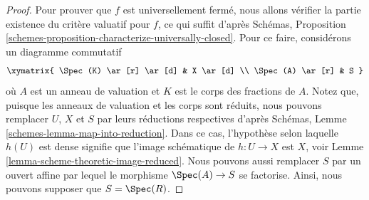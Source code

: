 \begin{proof}
Pour prouver que $f$ est universellement fermé, nous allons vérifier
la partie existence du critère valuatif pour
$f$, ce qui suffit d'après Schémas, Proposition \ref{schemes-proposition-characterize-universally-closed}. Pour ce faire,
considérons un diagramme commutatif
$$
\xymatrix{
\Spec(K) \ar[r] \ar[d] & X \ar[d] \\
\Spec(A) \ar[r] & S
}
$$
où $A$ est un anneau de valuation et $K$ est le corps des fractions
de $A$. Notez que, puisque les anneaux de valuation et
les corps sont réduits, nous pouvons remplacer $U$, $X$
et $S$ par leurs réductions respectives d'après Schémas,
Lemme \ref{schemes-lemma-map-into-reduction}. Dans ce cas, l'hypothèse selon laquelle
$h(U)$ est dense signifie que l'image schématique de $h : U \to X$
est $X$, voir Lemme \ref{lemma-scheme-theoretic-image-reduced}. Nous pouvons
aussi remplacer $S$ par un ouvert affine par lequel
le morphisme $\Spec(A) \to S$ se factorise. Ainsi, nous pouvons
supposer que $S = \Spec(R)$.


\end{proof}
